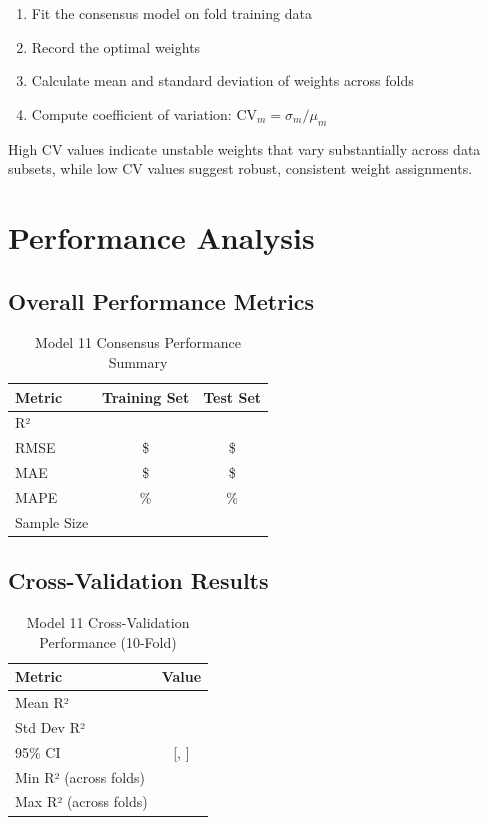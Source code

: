 \begin{enumerate}
    \item Fit the consensus model on fold training data
    \item Record the optimal weights
    \item Calculate mean and standard deviation of weights across folds
    \item Compute coefficient of variation: $\text{CV}_m = \sigma_m / \mu_m$
\end{enumerate}

High CV values indicate unstable weights that vary substantially across data subsets, while low CV values suggest robust, consistent weight assignments.

\section{Performance Analysis}

\subsection{Overall Performance Metrics}

\begin{table}[h]
\centering
\caption{Model 11 Consensus Performance Summary}
\label{tab:model11_performance}
\begin{tabular}{lcc}
\toprule
\textbf{Metric} & \textbf{Training Set} & \textbf{Test Set} \\
\midrule
R² & \ModelElevenRSquaredTrain{} & \ModelElevenRSquaredTest{} \\
RMSE & \$\ModelElevenRMSETrain{} & \$\ModelElevenRMSETest{} \\
MAE & \$\ModelElevenMAETrain{} & \$\ModelElevenMAETest{} \\
MAPE & \ModelElevenMAPETrain{}\% & \ModelElevenMAPETest{}\% \\
Sample Size & \ModelElevenTrainingSamples{} & \ModelElevenTestSamples{} \\
\bottomrule
\end{tabular}
\end{table}

\subsection{Cross-Validation Results}

\begin{table}[h]
\centering
\caption{Model 11 Cross-Validation Performance (10-Fold)}
\label{tab:model11_cv}
\begin{tabular}{lc}
\toprule
\textbf{Metric} & \textbf{Value} \\
\midrule
Mean R² & \ModelElevenCVMean{} \\
Std Dev R² & \ModelElevenCVStd{} \\
95\% CI & [\ModelElevenCVLower{}, \ModelElevenCVUpper{}] \\
Min R² (across folds) & \ModelElevenCVMin{} \\
Max R² (across folds) & \ModelElevenCVMax{} \\
\bottomrule
\end{tabular}
\end{table}

